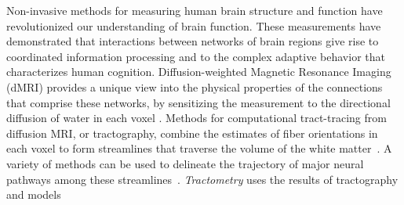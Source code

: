 \documentclass[10pt,letterpaper]{article}
\begin{document}
Non-invasive methods for measuring human brain structure and function have
revolutionized our understanding of brain function. These measurements
have demonstrated that interactions between networks of brain regions give rise
to coordinated information processing and to the complex adaptive behavior that
characterizes human cognition. Diffusion-weighted Magnetic Resonance Imaging
(dMRI) provides a unique view into the physical properties of the connections
that comprise these networks, by sensitizing the measurement to the directional
diffusion of water in each voxel \cite{wandell2016clarifying}.
Methods for computational tract-tracing from diffusion MRI, or tractography,
combine the estimates of fiber orientations in each voxel to form streamlines
that traverse the volume of the white matter~\cite{Conturo1999-je,
Mori2002-qi}. A variety of methods can be used to delineate the
trajectory of major neural pathways among these
streamlines~\cite{yeatman2012tract}.
\emph{Tractometry} uses the results of tractography and models
\end{document}
